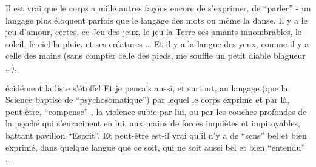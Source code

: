 Il est vrai que le corps a mille autres façons encore de s'exprimer, de ``parler'' -  un langage plus éloquent parfois que le langage des mots ou même la danse. Il y a le jeu d'amour, certes, ce Jeu des jeux, le jeu  la Terre  ses amants innombrables,  le soleil,  le ciel  la pluie, et   ses créatures \ldots{} Et il y a la langue des yeux, comme il y a celle des mains (sans compter celle des pieds, me souffle un petit diable blagueur \ldots),

écidément la liste  s'étoffe! Et je pensais aussi, et surtout, au langage (que la Science baptise de ``psychosomatique'') par lequel le corps exprime et par là, peut-être, ``compense'' , la violence subie par lui, ou par les couches profondes de la psyché qui s'enracinent en lui, aux mains de forces inquiètes et impitoyables, battant  pavillon ``Esprit''. Et peut-être est-il vrai qu'il n'y a de ``sens'' bel et bien exprimé,  dans quelque langue que ce soit, qui ne soit aussi bel et bien ``entendu'' \ldots

